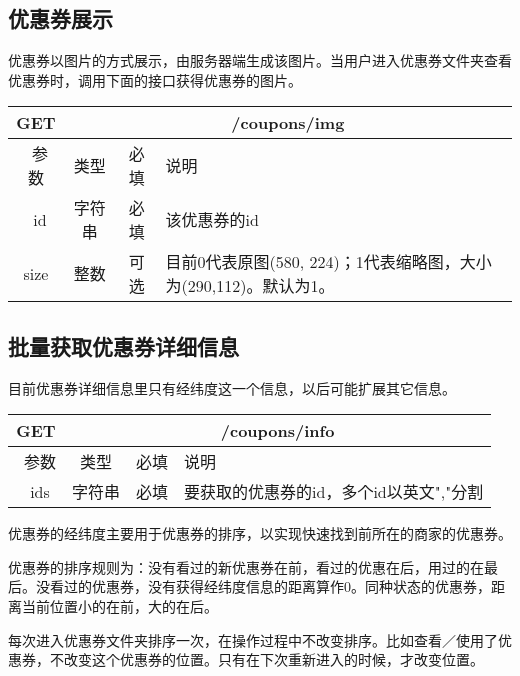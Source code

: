 \subsection{优惠券展示}
优惠券以图片的方式展示，由服务器端生成该图片。当用户进入优惠券文件夹查看优惠券时，调用下面的接口获得优惠券的图片。

\begin{table}[H]
   \begin{center}
\begin{tabular}{|c|c|c|p{12cm}|}
\hline
GET & \multicolumn{3}{|c|}{/coupons/img} \\
\hline\hline
 \  参数  & 类型 & 必填 &  说明  \\
\hline
 \  id  & 字符串 & 必填 &  该优惠券的id  \\
\hline
 size  & 整数 & 可选 &  目前0代表原图(580, 224)；1代表缩略图，大小为(290,112)。默认为1。\\ 
\hline
\end{tabular}
   \end{center}
\end{table}



\subsection{批量获取优惠券详细信息}
目前优惠券详细信息里只有经纬度这一个信息，以后可能扩展其它信息。
\begin{table}[H]
   \begin{center}
\begin{tabular}{|c|c|c|p{12cm}|}
\hline
GET & \multicolumn{3}{|c|}{/coupons/info} \\
\hline\hline
 \  参数  & 类型 & 必填 &  说明  \\
\hline
 \  ids  & 字符串 & 必填 &  要获取的优惠券的id，多个id以英文","分割  \\
 \hline
\end{tabular}
   \end{center}
\end{table}

优惠券的经纬度主要用于优惠券的排序，以实现快速找到前所在的商家的优惠券。

优惠券的排序规则为：没有看过的新优惠券在前，看过的优惠在后，用过的在最后。没看过的优惠券，没有获得经纬度信息的距离算作0。同种状态的优惠券，距离当前位置小的在前，大的在后。

每次进入优惠券文件夹排序一次，在操作过程中不改变排序。比如查看／使用了优惠券，不改变这个优惠券的位置。只有在下次重新进入的时候，才改变位置。


